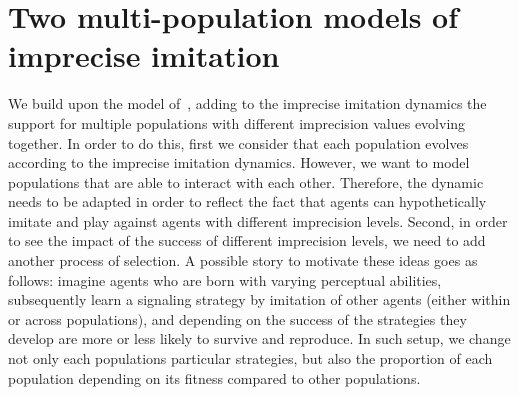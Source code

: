 \documentclass[a4paper]{article}
\begin{document}


\section{Two multi-population models of imprecise imitation}
\label{sec:multi-population-model}
We build upon the model of~\textcite{franke_vagueness_2017}, adding to the imprecise imitation dynamics the support for multiple populations with different imprecision values evolving together.
In order to do this, first we consider that each population evolves according to the imprecise imitation dynamics.
However, we want to model populations that are able to interact with each other.
Therefore, the dynamic needs to be adapted in order to reflect the fact that agents can hypothetically imitate and play against agents with different imprecision levels.
Second, in order to see the impact of the success of different imprecision levels, we need to add another process of selection.
A possible story to motivate these ideas goes as follows: imagine agents who are born with varying perceptual abilities, subsequently learn a signaling strategy by imitation of other agents (either within or across populations), and depending on the success of the strategies they develop are more or less likely to survive and reproduce.
In such setup, we change not only each populations particular strategies, but also the proportion of each population depending on its fitness compared to other populations.
\end{document}
